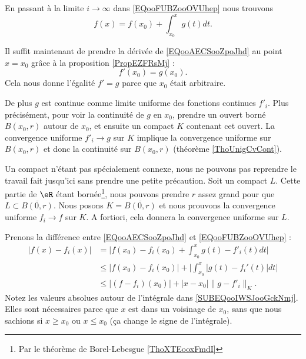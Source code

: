 \begin{normaltext}
\begin{subproof}

		En passant à la limite \( i\to \infty\) dans \eqref{EQooFUBZooOVUhep} nous trouvons
		\begin{equation}        \label{EQooAECSooZpoJhd}
			f(x)=f(x_0)+\int_{x_0}^xg(t)dt.
		\end{equation}

		Il suffit maintenant de prendre la dérivée de \eqref{EQooAECSooZpoJhd} au point \( x=x_0\) grâce à la proposition \ref{PropEZFRsMj} :
		\begin{equation}
			f'(x_0)=g(x_0).
		\end{equation}
		Cela nous donne l'égalité \( f'=g\) parce que \( x_0\) était arbitraire.

		De plus \( g\) est continue comme limite uniforme des fonctions continues \( f'_i\). Plus précisément, pour voir la continuité de \( g\) en \( x_0\), prendre un ouvert borné \( B(x_0,r)\) autour de \( x_0\), et ensuite un compact \( K\) contenant cet ouvert. La convergence uniforme \( f'_i\to g\) sur \( K\) implique la convergence uniforme sur \( B(x_0,r)\) et donc la continuité sur \( B(x_0,r)\) (théorème \ref{ThoUnigCvCont}).


		Un compact n'étant pas spécialement connexe, nous ne pouvons pas reprendre le travail fait jusqu'ici sans prendre une petite précaution. Soit un compact \( L\). Cette partie de \( \eR\) étant bornée\footnote{Par le théorème de Borel-Lebesgue \ref{ThoXTEooxFmdI}}, nous pouvons prendre \( r\) assez grand pour que \( L\subset \overline{ B(0,r) }\). Nous posons \( K=\overline{ B(0,r) }\) et nous prouvons la convergence uniforme \( f_i\to f\) sur \( K\). A fortiori, cela donnera la convergence uniforme sur \( L\).

		Prenons la différence entre \eqref{EQooAECSooZpoJhd} et \eqref{EQooFUBZooOVUhep} :
		\begin{subequations}
			\begin{align}
				| f(x)-f_i(x) | & =\big| f(x_0)-f_i(x_0)+\int_{x_0}^x g(t)-f'_i(t)dt \big|                                               \\
				                & \leq | f(x_0)-f_i(x_0) |+\Big| \int_{x_0}^x| g(t)-f_i'(t) |dt  \Big|       \label{SUBEQooIWSJooGckNmj} \\
				                & \leq | (f-f_i)(x_0) |+| x-x_0 |\| g-f'_i \|_K.
			\end{align}
		\end{subequations}
		Notez les valeurs absolues autour de l'intégrale dans \eqref{SUBEQooIWSJooGckNmj}. Elles sont nécessaires parce que \( x\) est dans un voisinage de \( x_0\), sans que nous sachions si \( x\geq x_0\) ou \( x\leq x_0\) (ça change le signe de l'intégrale).


\end{subproof}
\end{normaltext}
